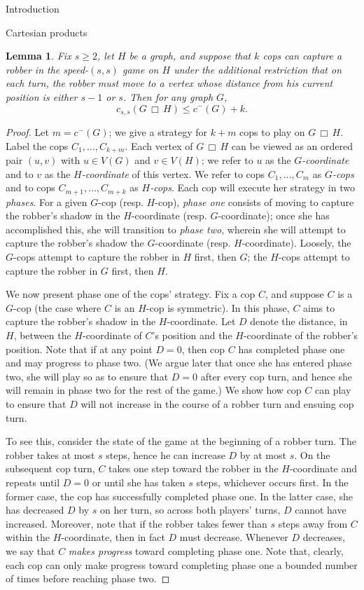 \documentclass[12pt]{amsart}
\newtheorem{lemma}{Lemma}[section]
\theoremstyle{definition}
\def\cart{\, \Box \,}
\newcommand{\speed}[1]{c_{#1,#1}}
\begin{document}
\begin{section}{Introduction}
\begin{section}{Cartesian products}
\begin{lemma}\label{lem:active_and_change}
Fix $s \ge 2$, let $H$ be a graph, and suppose that $k$ cops can capture a robber in the speed-$(s,s)$ game on $H$ under the additional restriction that on each turn, the robber must move to a vertex whose distance from his current position is either $s-1$ or $s$.  Then for any graph $G$,
$$\speed{s}(G \cart H) \le c^-(G) + k.$$
\end{lemma}
\begin{proof}
Let $m = c^-(G)$; we give a strategy for $k+m$ cops to play on $G \cart H$.  Label the cops $C_1,\dots,C_{k+m}$.  Each vertex of $G \cart H$ can be viewed as an ordered pair $(u,v)$ with $u \in V(G)$ and $v \in V(H)$; we refer to $u$ as the \textit{$G$-coordinate} and to $v$ as the \textit{$H$-coordinate} of this vertex.  We refer to cops $C_1, \dots, C_m$ as \textit{$G$-cops} and to cops $C_{m+1}, \dots, C_{m+k}$ as \textit{$H$-cops}.  Each cop will execute her strategy in two \textit{phases}.  For a given $G$-cop (resp. $H$-cop), \textit{phase one} consists of moving to capture the robber's shadow in the $H$-coordinate (resp. $G$-coordinate);  once she has accomplished this, she will transition to \textit{phase two}, wherein she will attempt to capture the robber's shadow the $G$-coordinate (resp. $H$-coordinate).  Loosely, the $G$-cops attempt to capture the robber in $H$ first, then $G$; the $H$-cops attempt to capture the robber in $G$ first, then $H$. 
          
We now present phase one of the cops' strategy.  Fix a cop $C$, and suppose $C$ is a $G$-cop (the case where $C$ is an $H$-cop is symmetric).  In this phase, $C$ aims to capture the robber's shadow in the $H$-coordinate.  Let $D$ denote the distance, in $H$, between the $H$-coordinate of $C$'s position and the $H$-coordinate of the robber's position.  Note that if at any point $D = 0$, then cop $C$ has completed phase one and may progress to phase two.  (We argue later that once she has entered phase two, she will play so as to ensure that $D=0$ after every cop turn, and hence she will remain in phase two for the rest of the game.)  We show how cop $C$ can play to ensure that $D$ will not increase in the course of a robber turn and ensuing cop turn.

To see this, consider the state of the game at the beginning of a robber turn.  The robber takes at most $s$ steps, hence he can increase $D$ by at most $s$.  On the subsequent cop turn, $C$ takes one step toward the robber in the $H$-coordinate and repeats until $D=0$ or until she has taken $s$ steps, whichever occurs first.  In the former case, the cop has successfully completed phase one.  In the latter case, she has decreased $D$ by $s$ on her turn, so across both players' turns, $D$ cannot have increased.  Moreover, note that if the robber takes fewer than $s$ steps away from $C$ within the $H$-coordinate, then in fact $D$ must decrease.  Whenever $D$ decreases, we say that $C$ \textit{makes progress} toward completing phase one.  Note that, clearly, each cop can only make progress toward completing phase one a bounded number of times before reaching phase two.
            

\end{proof}
\end{section}
\end{section}
\end{document}
